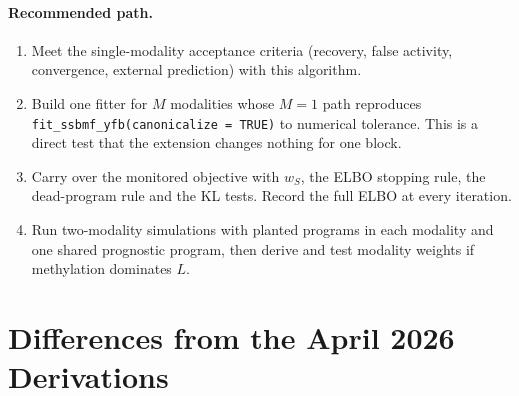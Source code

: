 \documentclass[11pt]{article}
\newcommand{\ws}{w_S}
\begin{document}
\paragraph{Recommended path.}
\begin{enumerate}
  \item Meet the single-modality acceptance criteria (recovery, false activity,
        convergence, external prediction) with this algorithm.
  \item Build one fitter for $M$ modalities whose $M = 1$ path reproduces
        \texttt{fit\_ssbmf\_yfb(canonicalize = TRUE)} to numerical tolerance.
        This is a direct test that the extension changes nothing for one block.
  \item Carry over the monitored objective with $\ws$, the ELBO stopping rule, the
        dead-program rule and the KL tests. Record the full ELBO at every
        iteration.
  \item Run two-modality simulations with planted programs in each modality and
        one shared prognostic program, then derive and test modality weights if
        methylation dominates $L$.
\end{enumerate}

\section{Differences from the April 2026 Derivations}\label{sec:errata}
\end{document}
